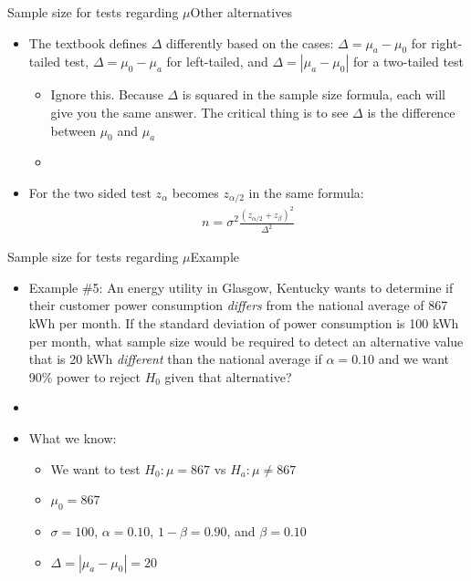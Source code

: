 \documentclass[xcolor=dvipsnames]{beamer}
\begin{document}
\begin{frame}{Sample size for tests regarding $\mu$}{Other alternatives}
	\begin{itemize}
		\item The textbook defines $\Delta$ differently based on the cases: $\Delta = \mu_a - \mu_0$ for right-tailed test, $\Delta = \mu_0 - \mu_a$ for left-tailed, and $\Delta = |\mu_a - \mu_0|$ for a two-tailed test \pause
		\begin{itemize}
			\item Ignore this. Because $\Delta$ is squared in the sample size formula, each will give you the same answer. The critical thing is to see $\Delta$ is the difference between $\mu_0$ and $\mu_a$ \pause
			\item[]
		\end{itemize}
	\item For the two sided test $z_{\alpha}$ becomes $z_{\alpha/2}$ in the same formula: \pause
	\begin{gather*}
		n = \sigma^2\frac{(z_{\alpha/2} + z_{\beta})^2}{\Delta^2}
	\end{gather*}
	\end{itemize}
\end{frame}

\begin{frame}{Sample size for tests regarding $\mu$}{Example}
	\begin{itemize}
		\item Example \#5: An energy utility in Glasgow, Kentucky wants to determine if their customer power consumption \emph{differs} from the national average of 867 kWh per month. If the standard deviation of power consumption is 100 kWh per month, what sample size would be required to detect an alternative value that is 20 kWh \emph{different} than the national average if $\alpha = 0.10$ and we want 90\% power to reject $H_0$ given that alternative? \pause
		\item[]
		\item What we know: \pause
		\begin{itemize}
			\item We want to test $H_0: \mu = 867$ vs $H_a: \mu \neq 867$ \pause
			\item $\mu_0 = 867$ \pause
			\item $\sigma = 100$, $\alpha = 0.10$, $1-\beta = 0.90$, and $\beta = 0.10$ \pause
			\item $\Delta = |\mu_a - \mu_0| = 20$
		\end{itemize}
	\end{itemize}
\end{frame}
\end{document}
